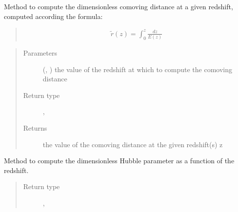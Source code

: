 \documentclass[letterpaper,10pt,english]{sphinxmanual}
\begin{document}
\begin{fulllineitems}
\begin{fulllineitems}
\label{\detokenize{api/seyfert.cosmology.cosmology.Cosmology:seyfert.cosmology.cosmology.Cosmology.computeDimensionlessComovingDistance}}
\sphinxAtStartPar
Method to compute the dimensionless comoving distance at a given redshift, computed according the formula:
\begin{quote}
\begin{equation*}
\begin{split}\tilde{r}(z) = \int_{0}^{z} \frac{dz}{E(z)}\end{split}
\end{equation*}\end{quote}
\begin{quote}\begin{description}
\item[{Parameters}] \leavevmode
\sphinxAtStartPar
{} (\sphinxcode{\sphinxupquote{Union}}{[}, \sphinxcode{\sphinxupquote{ndarray}}{]}) \textendash{} the value of the redshift at which to compute the comoving distance

\item[{Return type}] \leavevmode
\sphinxAtStartPar
\sphinxcode{\sphinxupquote{Union}}{[}, \sphinxcode{\sphinxupquote{ndarray}}{]}

\item[{Returns}] \leavevmode
\sphinxAtStartPar
the value of the comoving distance at the given redshift(s) z

\end{description}\end{quote}

\end{fulllineitems}


\begin{fulllineitems}
\label{\detokenize{api/seyfert.cosmology.cosmology.Cosmology:seyfert.cosmology.cosmology.Cosmology.computeDimensionlessHubbleParameter}}
\sphinxAtStartPar
Method to compute the dimensionless Hubble parameter as a function of the redshift.
\begin{quote}\begin{description}
\item[{Return type}] \leavevmode
\sphinxAtStartPar
\sphinxcode{\sphinxupquote{Union}}{[}, \sphinxcode{\sphinxupquote{ndarray}}{]}


\end{description}
\end{quote}
\end{fulllineitems}
\end{fulllineitems}
\end{document}
